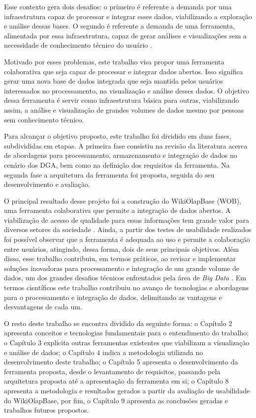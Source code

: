 Esse contexto gera dois desafios: o primeiro é referente a demanda por uma infraestrutura 
capaz de processar e integrar esses dados, viabilizando a exploração e análise dessas bases. 
O segundo é referente a demanda de uma ferramenta, alimentada por essa infraestrutura, capaz 
de gerar análises e visualizações sem a necessidade de conhecimento técnico do usuário 
\cite{graves2013}.

Motivado por esses problemas, este trabalho visa propor uma ferramenta colaborativa que 
seja capaz de processar e integrar dados abertos. Isso significa gerar uma 
nova base de dados integrada que seja mantida pelos usuários interessados no processamento, 
na visualização e análise desses dados. O objetivo dessa ferramenta é servir como 
infraestrutura básica para outras, viabilizando assim, a análise e visualização de grandes 
volumes de dados mesmo por pessoas sem conhecimento técnico. 

Para alcançar o objetivo proposto, este trabalho foi dividido em duas fases, subdivididas 
em etapas. A primeira fase consistiu na revisão da literatura acerca de abordagens para 
processamento, armazenamento e integração de dados no cenário dos DGA, bem como na definição 
dos requisitos da ferramenta. Na segunda fase a arquitetura da ferramenta foi proposta, 
seguida do seu desenvolvimento e avaliação.

O principal resultado desse projeto foi a construção do WikiOlapBase (WOB), uma ferramenta 
colaborativa que permite a integração de dados abertos. A viabilização de acesso de qualidade 
para essas informações tem grande valor para diversos setores da sociedade \cite{vaz2010dados}. 
Ainda, a partir dos testes de usabilidade realizados foi possível observar que a ferramenta é 
adequada ao uso e permite a colaboração entre usuários, atingindo, dessa forma, dois de seus
principais objetivos. Além disso, esse trabalho contribuiu, em termos práticos, ao revisar e 
implementar soluções inovadoras para processamento e integração de um grande volume de dados, 
um dos grandes desafios técnicos enfrentados pela área de \textit{Big Data} 
\cite{jagadish2014}. Em termos científicos este trabalho contribuiu no avanço de 
tecnologias e abordagens para o processamento e integração de dados, delimitando as 
vantagens e desvantagens de cada um.

O resto deste trabalho se encontra dividido da seguinte forma: o Capítulo 2 apresenta
conceitos e tecnologias fundamentais para o entendimento do trabalho; o Capítulo 3 explicita
outras ferramentas existentes que viabilizam a visualização e análise de dados; o Capítulo 4
indica a metodologia utilizada no desenvolvimento deste trabalho; o Capítulo 5 apresenta o 
desenvolvimento da ferramenta proposta, desde o levantamento de requisitos, passando pela
arquitetura proposta até a apresentação da ferramenta em si; o Capítulo 8 apresenta a 
metodologia e resultados gerados a partir da avaliação de usabilidade do
WikiOlapBase, por fim, o Capítulo 9 apresenta as conclusões geradas e trabalhos futuros
propostos.